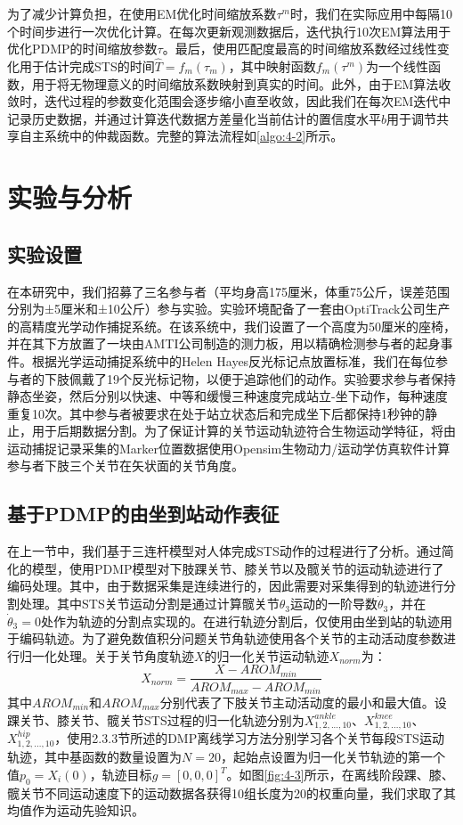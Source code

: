 为了减少计算负担，在使用EM优化时间缩放系数$\tau^{m}$时，我们在实际应用中每隔10个时间步进行一次优化计算。在每次更新观测数据后，迭代执行10次EM算法用于优化PDMP的时间缩放参数$\tau$。最后，使用匹配度最高的时间缩放系数经过线性变化用于估计完成STS的时间$\hat T=f_m(\tau_m)$，其中映射函数$f_m(\tau^m)$为一个线性函数，用于将无物理意义的时间缩放系数映射到真实的时间。此外，由于EM算法收敛时，迭代过程的参数变化范围会逐步缩小直至收敛，因此我们在每次EM迭代中记录历史数据，并通过计算迭代数据方差量化当前估计的置信度水平$b$用于调节共享自主系统中的仲裁函数。完整的算法流程如\ref{algo:4-2}所示。


\section{实验与分析}
\subsection{实验设置} 
在本研究中，我们招募了三名参与者（平均身高175厘米，体重75公斤，误差范围分别为±5厘米和±10公斤）参与实验。实验环境配备了一套由OptiTrack公司生产的高精度光学动作捕捉系统。在该系统中，我们设置了一个高度为50厘米的座椅，并在其下方放置了一块由AMTI公司制造的测力板，用以精确检测参与者的起身事件。根据光学运动捕捉系统中的Helen Hayes反光标记点放置标准，我们在每位参与者的下肢佩戴了19个反光标记物，以便于追踪他们的动作。实验要求参与者保持静态坐姿，然后分别以快速、中等和缓慢三种速度完成站立-坐下动作，每种速度重复10次。其中参与者被要求在处于站立状态后和完成坐下后都保持1秒钟的静止，用于后期数据分割。为了保证计算的关节运动轨迹符合生物运动学特征，将由运动捕捉记录采集的Marker位置数据使用Opensim生物动力/运动学仿真软件计算参与者下肢三个关节在矢状面的关节角度。

\subsection{基于PDMP的由坐到站动作表征} 
在上一节中，我们基于三连杆模型对人体完成STS动作的过程进行了分析。通过简化的模型，使用PDMP模型对下肢踝关节、膝关节以及髋关节的运动轨迹进行了编码处理。其中，由于数据采集是连续进行的，因此需要对采集得到的轨迹进行分割处理。其中STS关节运动分割是通过计算髋关节$\theta_3$运动的一阶导数$\dot\theta_3$，并在$\dot\theta_3=0$处作为轨迹的分割点实现的。在进行轨迹分割后，仅使用由坐到站的轨迹用于编码轨迹。为了避免数值积分问题关节角轨迹使用各个关节的主动活动度参数进行归一化处理。关于关节角度轨迹$X$的归一化关节运动轨迹$X_{norm}$为：
\begin{equation}
    X_{norm} = \frac{X-AROM_{min}}{AROM_{max}-AROM_{min}}
\end{equation}
其中$AROM_{min}$和$AROM_{max}$分别代表了下肢关节主动活动度的最小和最大值。设踝关节、膝关节、髋关节STS过程的归一化轨迹分别为$X_{1,2,...,10}^{ankle}$、$X_{1,2,...,10}^{knee}$、$X_{1,2,...,10}^{hip}$，使用2.3.3节所述的DMP离线学习方法分别学习各个关节每段STS运动轨迹，其中基函数的数量设置为$N=20$，起始点设置为归一化关节轨迹的第一个值$p_0=X_i(0)$，轨迹目标$g=[0,0,0]^T$。如图\ref{fig:4-3}所示，在离线阶段踝、膝、髋关节不同运动速度下的运动数据各获得10组长度为20的权重向量，我们求取了其均值作为运动先验知识。

